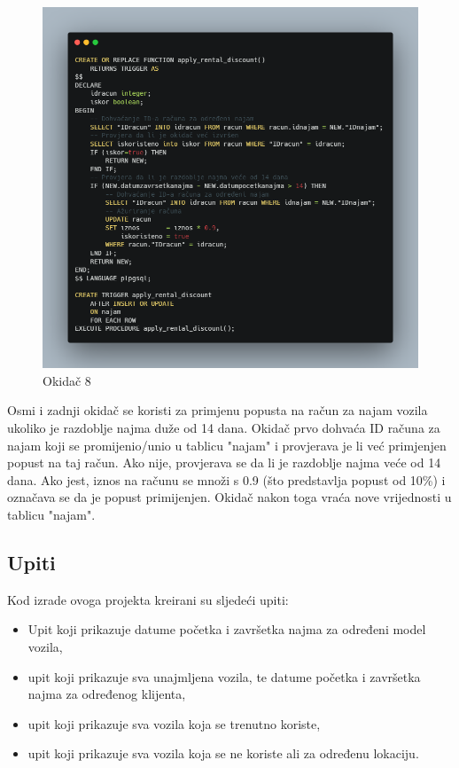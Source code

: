 \documentclass[]{foi}
\begin{document}
\begin{figure}[!ht]
    \centering
    \includegraphics[width=1\textwidth]{slike/8.png}
    \caption{Okidač 8}
    \label{fig:osmi}
\end{figure}

Osmi i zadnji okidač se koristi za primjenu popusta na račun za najam vozila ukoliko je razdoblje najma duže od 14 dana. Okidač prvo dohvaća ID računa za najam koji se promijenio/unio u tablicu "najam" i provjerava je li već primjenjen popust na taj račun. Ako nije, provjerava se da li je razdoblje najma veće od 14 dana. Ako jest, iznos na računu se množi s 0.9 (što predstavlja popust od 10\%) i označava se da je popust primijenjen. Okidač nakon toga vraća nove vrijednosti u tablicu "najam".
\newpage

\subsection{Upiti}

Kod izrade ovoga projekta kreirani su sljedeći upiti:

\begin{itemize}
  \item Upit koji prikazuje datume početka i završetka najma za određeni model vozila,
  \item upit koji prikazuje sva unajmljena vozila, te datume početka i završetka najma za određenog klijenta,
  \item upit koji prikazuje sva vozila koja se trenutno koriste,
  \item upit koji prikazuje sva vozila koja se ne koriste ali za određenu lokaciju.
\end{itemize}
\end{document}
